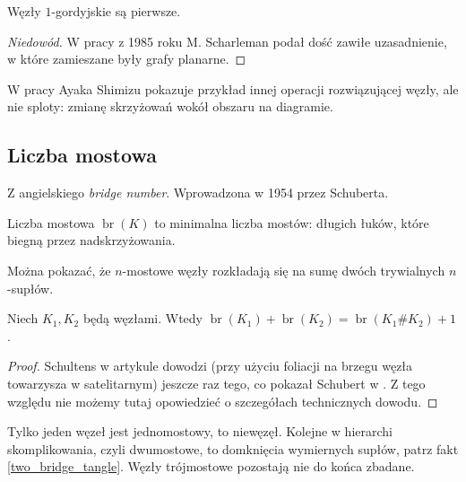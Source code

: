 \begin{proposition}
    Węzły $1$-gordyjskie są pierwsze.
\end{proposition}

\begin{proof}[Niedowód]
    W pracy \cite{scharleman85} z 1985 roku M. Scharleman podał dość zawiłe uzasadnienie, w które zamieszane były grafy planarne.
\end{proof}

W pracy \cite{shimizu14} Ayaka Shimizu pokazuje przykład innej operacji rozwiązującej węzły, ale nie sploty: zmianę skrzyżowań wokół obszaru na diagramie.


\subsection{Liczba mostowa} %
\label{sub:bridge_index}
Z angielskiego \emph{bridge number}.
Wprowadzona w 1954 przez Schuberta.
\begin{definition}
    Liczba mostowa $\operatorname{br}(K)$ to minimalna liczba mostów: długich łuków, które biegną przez nadskrzyżowania.
\end{definition}

Można pokazać, że $n$-mostowe węzły rozkładają się na sumę dwóch trywialnych $n$-supłów.

\begin{proposition}
    Niech $K_1, K_2$ będą węzłami.
    Wtedy $\operatorname{br} (K_1) + \operatorname{br}(K_2) = \operatorname{br}(K_1 \# K_2) + 1$.
\end{proposition}

\begin{proof}
    Schultens w artykule \cite{schultens03} dowodzi (przy użyciu foliacji na brzegu węzła towarzysza w satelitarnym) jeszcze raz tego, co pokazał Schubert w \cite{schubert54}.
    Z tego względu nie możemy tutaj opowiedzieć o szczegółach technicznych dowodu.
\end{proof}

Tylko jeden węzeł jest jednomostowy, to niewęzęł.
Kolejne w hierarchi skomplikowania, czyli dwumostowe, to domknięcia wymiernych supłów, patrz fakt \ref{two_bridge_tangle}.
Węzły trójmostowe pozostają nie do końca zbadane.



